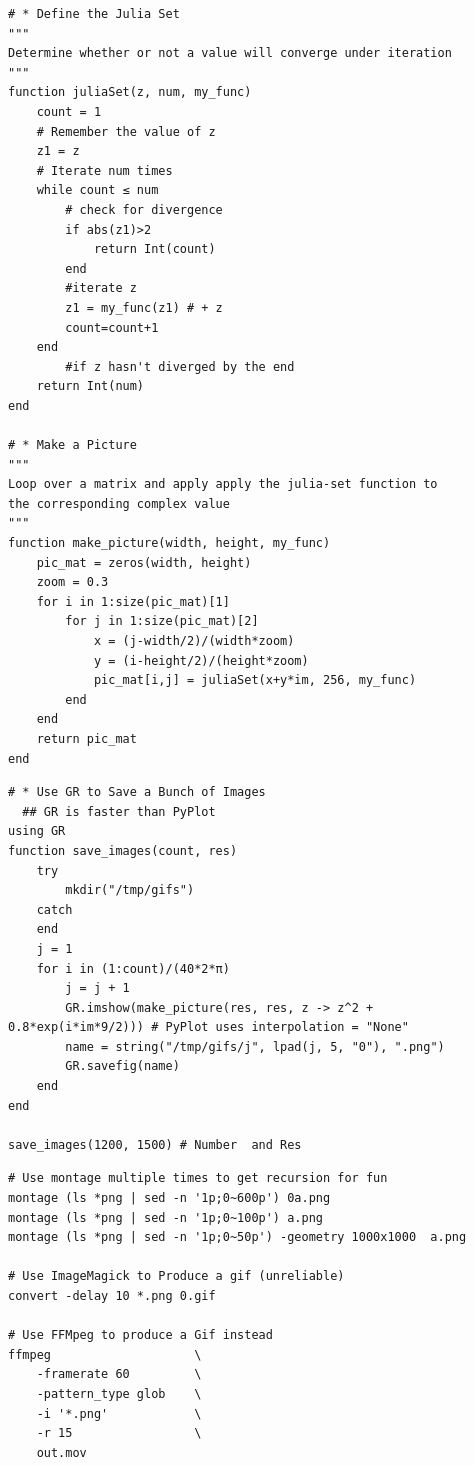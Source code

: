 \documentclass[a4paper,11pt,twoside]{article}
\begin{document}
\begin{listing}[htbp]
\begin{verbatim}
# * Define the Julia Set
"""
Determine whether or not a value will converge under iteration
"""
function juliaSet(z, num, my_func)
    count = 1
    # Remember the value of z
    z1 = z
    # Iterate num times
    while count ≤ num
        # check for divergence
        if abs(z1)>2
            return Int(count)
        end
        #iterate z
        z1 = my_func(z1) # + z
        count=count+1
    end
        #if z hasn't diverged by the end
    return Int(num)
end

# * Make a Picture
"""
Loop over a matrix and apply apply the julia-set function to
the corresponding complex value
"""
function make_picture(width, height, my_func)
    pic_mat = zeros(width, height)
    zoom = 0.3
    for i in 1:size(pic_mat)[1]
        for j in 1:size(pic_mat)[2]
            x = (j-width/2)/(width*zoom)
            y = (i-height/2)/(height*zoom)
            pic_mat[i,j] = juliaSet(x+y*im, 256, my_func)
        end
    end
    return pic_mat
end

\end{verbatim}
\caption{\label{julia-gen-fracs}Produce a series of fractals using julia}
\end{listing}

\begin{listing}[htbp]
\begin{verbatim}
# * Use GR to Save a Bunch of Images
  ## GR is faster than PyPlot
using GR
function save_images(count, res)
    try
        mkdir("/tmp/gifs")
    catch
    end
    j = 1
    for i in (1:count)/(40*2*π)
        j = j + 1
        GR.imshow(make_picture(res, res, z -> z^2 + 0.8*exp(i*im*9/2))) # PyPlot uses interpolation = "None"
        name = string("/tmp/gifs/j", lpad(j, 5, "0"), ".png")
        GR.savefig(name)
    end
end

save_images(1200, 1500) # Number  and Res
\end{verbatim}
\caption{\label{GR-save}Generate and save the images with GR}
\end{listing}

\begin{listing}[htbp]
\begin{verbatim}
# Use montage multiple times to get recursion for fun
montage (ls *png | sed -n '1p;0~600p') 0a.png
montage (ls *png | sed -n '1p;0~100p') a.png
montage (ls *png | sed -n '1p;0~50p') -geometry 1000x1000  a.png

# Use ImageMagick to Produce a gif (unreliable)
convert -delay 10 *.png 0.gif

# Use FFMpeg to produce a Gif instead
ffmpeg                    \
    -framerate 60         \
    -pattern_type glob    \
    -i '*.png'            \
    -r 15                 \
    out.mov


\end{verbatim}
\caption{\label{bash-frac-join}Using \texttt{bash}, \texttt{ffmpeg} and \emph{ImageMagick} to combine the images and produce an animation.}
\end{listing}
\end{document}
